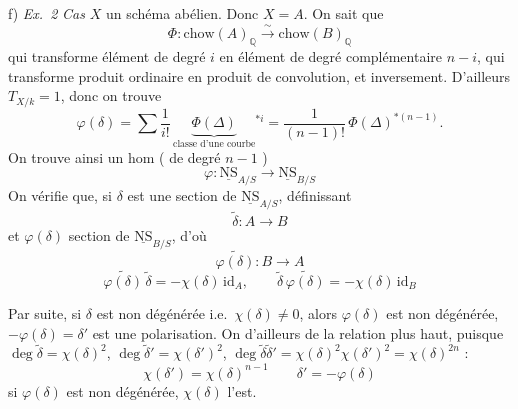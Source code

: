 \documentclass[11pt,a4paper]{article}
\begin{document}
f) \emph{Ex.\ 2}\quad \struck{\ill{}} \emph{Cas} $X$ un schéma abélien. Donc
$X = A$. On sait que  \struck{\ill{}}
\[
\Phi : \mathrm{chow}(A)_{\mathbb{Q}} \xrightarrow{\ \sim\ } \mathrm{chow}(B)_{\mathbb{Q}}
\]
qui \struck{\ill{}} transforme élément de degré $i$ en élément de degré
complémentaire $n - i$,  qui transforme produit ordinaire en produit de
convolution, et inversement. D'ailleurs $T_{X/k} = 1$, donc on trouve
\[
\varphi(\delta) = \sum \frac{1}{i!}\, \underbrace{\Phi(\Delta)}_{\text{classe d'une courbe}}{}^{*i}
= \frac{1}{(n-1)!}\, \Phi(\Delta)^{*(n-1)} .
\]
 On trouve ainsi un hom ( de degré
$n - 1$ \ill{})
\[
\varphi : \underline{\mathrm{NS}}_{A/S} \longrightarrow \underline{\mathrm{NS}}_{B/S}
\]
On vérifie que, si $\delta$ est une section de $\underline{\mathrm{NS}}_{A/S}$,
définissant
\[ \tilde{\delta} : A \longrightarrow B \]
et $\varphi(\delta)$ section de $\underline{\mathrm{NS}}_{B/S}$, d'où
\[ \widetilde{\varphi(\delta)} : B \longrightarrow A \]
\[
\boxed{\widetilde{\varphi(\delta)}\, \tilde{\delta} = -\chi(\delta)\, \mathrm{id}_A ,
\qquad \tilde{\delta}\, \widetilde{\varphi(\delta)} = -\chi(\delta)\, \mathrm{id}_B}
\]


Par suite, si $\delta$ est non dégénérée i.e.\ $\chi(\delta) \neq 0$, alors
$\varphi(\delta)$ est non dégénérée,  
$-\varphi(\delta) = \delta'$ est une polarisation. On \add{\ill{}}
d'ailleurs de la relation plus haut, puisque
$\deg \tilde{\delta} = \chi(\delta)^{2}$,
$\deg \tilde{\delta}' = \chi(\delta')^{2}$,
$\deg \tilde{\delta}\tilde{\delta}' = \chi(\delta)^{2}\chi(\delta')^{2}
= \chi(\delta)^{2n}$ :
\[
\chi(\delta') = \chi(\delta)^{n-1} \qquad \delta' = -\varphi(\delta)
\]
si $\varphi(\delta)$ est non dégénérée, \struck{\ill{} $\delta$ \ill{}}
$\chi(\delta)$ l'est.
\end{document}
